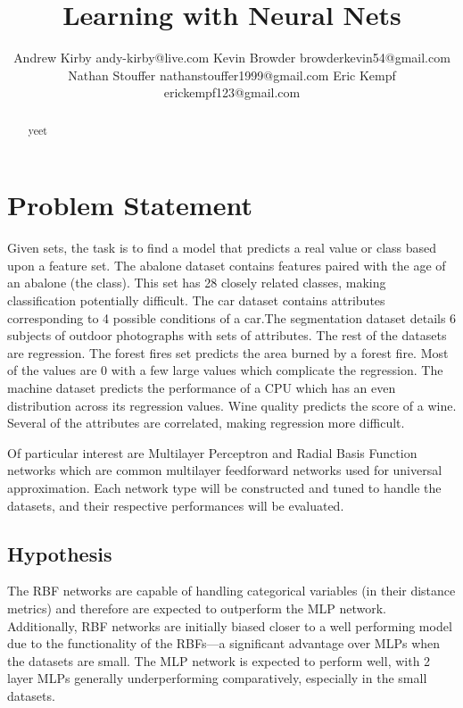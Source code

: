\documentclass[twoside,11pt]{article}
\begin{document}
\title{Learning with Neural Nets}

\author{\name Andrew Kirby \email andy-kirby@live.com \AND
		\name Kevin Browder \email browderkevin54@gmail.com \AND
		\name Nathan Stouffer \email nathanstouffer1999@gmail.com \AND
		\name Eric Kempf \email erickempf123@gmail.com }

\maketitle

\begin{abstract}
yeet
\end{abstract}

\section{Problem Statement}


Given sets, the task is to find a model that predicts a real value or class based upon a feature set. The abalone dataset contains features paired with the age of an abalone (the class). This set has 28 closely related classes, making classification potentially difficult. The car dataset contains attributes corresponding to 4 possible conditions of a car.The segmentation dataset details 6 subjects of outdoor photographs with sets of attributes. The rest of the datasets are regression. The forest fires set predicts the area burned by a forest fire. Most of the values are 0 with a few large values which complicate the regression. The machine dataset predicts the performance of a CPU which has an even distribution across its regression values. Wine quality predicts the score of a wine. Several of the attributes are correlated, making regression more difficult.

Of particular interest are Multilayer Perceptron and Radial Basis Function networks which are common multilayer feedforward networks used for universal approximation. Each network type will be constructed and tuned to handle the datasets, and their respective performances will be evaluated.


\subsection*{Hypothesis}

The RBF networks are capable of handling categorical variables (in their distance metrics) and therefore are expected to outperform the MLP network. Additionally, RBF networks are initially biased closer to a well performing model due to the functionality of the RBFs---a significant advantage over MLPs when the datasets are small. The MLP network is expected to perform well, with 2 layer MLPs generally underperforming comparatively, especially in the small datasets.
\end{document}
